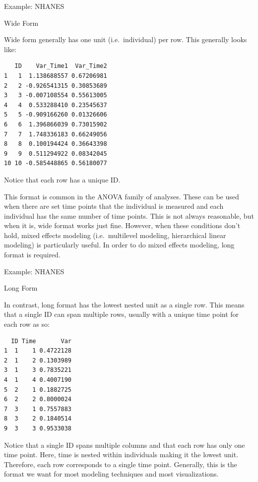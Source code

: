 \begin{frame}[fragile]{Example: NHANES}

\begin{block}{Wide Form}

Wide form generally has one unit (i.e.~individual) per row. This
generally looks like:

\begin{verbatim}
   ID    Var_Time1  Var_Time2
1   1  1.138688557 0.67206981
2   2 -0.926541315 0.30853689
3   3 -0.007108554 0.55613005
4   4  0.533288410 0.23545637
5   5 -0.909166260 0.01326606
6   6  1.396866039 0.73015902
7   7  1.748336183 0.66249056
8   8  0.100194424 0.36643398
9   9  0.511294922 0.08342045
10 10 -0.585448865 0.56180077
\end{verbatim}

Notice that each row has a unique ID.

This format is common in the ANOVA family of analyses. These can be used
when there are set time points that the individual is measured and each
individual has the same number of time points. This is not always
reasonable, but when it is, wide format works just fine. However, when
these conditions don't hold, mixed effects modeling (i.e.~multilevel
modeling, hierarchical linear modeling) is particularly useful. In order
to do mixed effects modeling, long format is required.

\end{block}

\end{frame}

\begin{frame}[fragile]{Example: NHANES}

\begin{block}{Long Form}

In contrast, long format has the lowest nested unit as a single row.
This means that a single ID can span multiple rows, usually with a
unique time point for each row as so:

\begin{verbatim}
  ID Time       Var
1  1    1 0.4722128
2  1    2 0.1303989
3  1    3 0.7835221
4  1    4 0.4007190
5  2    1 0.1882725
6  2    2 0.8000024
7  3    1 0.7557883
8  3    2 0.1840514
9  3    3 0.9533038
\end{verbatim}

Notice that a single ID spans multiple columns and that each row has
only one time point. Here, time is nested within individuals making it
the lowest unit. Therefore, each row corresponds to a single time point.
Generally, this is the format we want for most modeling techniques and
most visualizations.

\end{block}

\end{frame}

